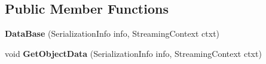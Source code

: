 \subsection*{Public Member Functions}
\begin{DoxyCompactItemize}
\item 
\hypertarget{class_dwarf_d_b_1_1_data_structures_1_1_data_base_a9748f9609030f61d1cfc28a162a48ad5}{{\bfseries Data\+Base} (Serialization\+Info info, Streaming\+Context ctxt)}\label{class_dwarf_d_b_1_1_data_structures_1_1_data_base_a9748f9609030f61d1cfc28a162a48ad5}

\item 
\hypertarget{class_dwarf_d_b_1_1_data_structures_1_1_data_base_a34980ba6f61e15d6dcbe5af7f596a6fd}{void {\bfseries Get\+Object\+Data} (Serialization\+Info info, Streaming\+Context ctxt)}\label{class_dwarf_d_b_1_1_data_structures_1_1_data_base_a34980ba6f61e15d6dcbe5af7f596a6fd}


\end{DoxyCompactItemize}
